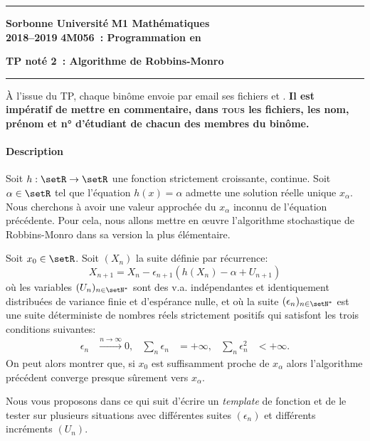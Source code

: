 \documentclass[10pt]{article}
\begin{document}
\hrule \vspace*{5pt} \noindent 
\textbf{Sorbonne Université} \hfill \textbf{M1 Mathématiques}\\
\textbf{2018--2019} \hfill \textbf{4M056~: Programmation en \CPP}
\begin{center}
\textbf{TP not\'e 2~: Algorithme de Robbins-Monro}
\end{center}
\hrule \vspace*{20pt}

À l'issue du TP, chaque binôme envoie par email ses fichiers  et .
\textbf{Il est imp\'eratif de mettre en commentaire, dans
\textsc{tous} les fichiers, les nom, pr\'enom et n° d'\'etudiant de chacun des
membres du bin\^ome.}

\paragraph{Description}
Soit $h : \setR\to\setR$ une fonction strictement croissante, continue. Soit $\alpha\in\setR$ tel que l'équation $h(x)=\alpha$ admette une solution réelle unique $x_\alpha$. Nous cherchons à avoir une valeur approchée du $x_\alpha$ inconnu de l'équation précédente. Pour cela, nous allons mettre en \oe{}uvre l'algorithme stochastique de Robbins-Monro dans sa version la plus élémentaire. 

Soit $x_0\in\setR$. Soit $(X_n)$ la suite définie par récurrence:
\begin{equation}
X_{n+1} = X_n - \epsilon_{n+1} ( h(X_n)- \alpha + U_{n+1})
\end{equation}
où les variables $(U_n)_{n\in\setN^*}$ sont des v.a. indépendantes et identiquement distribuées de variance finie et d'espérance nulle, et où la suite $(\epsilon_n)_{n\in\setN^*}$ est une suite déterministe de nombres réels strictement positifs qui satisfont les trois conditions suivantes:
\begin{align*}
\epsilon_n&\xrightarrow{n\to\infty} 0, 
&
\sum_{n} \epsilon_n &= +\infty,
&
\sum_{n} \epsilon_n^2 &< +\infty.
\end{align*}
On peut alors montrer que, si $x_0$ est suffisamment proche de $x_\alpha$ alors l'algorithme précédent converge presque sûrement vers $x_\alpha$.

Nous vous proposons dans ce qui suit d'écrire un \emph{template} de fonction  et de le tester sur plusieurs situations avec différentes suites $(\epsilon_n)$ et différents incréments $(U_n)$.
\end{document}
